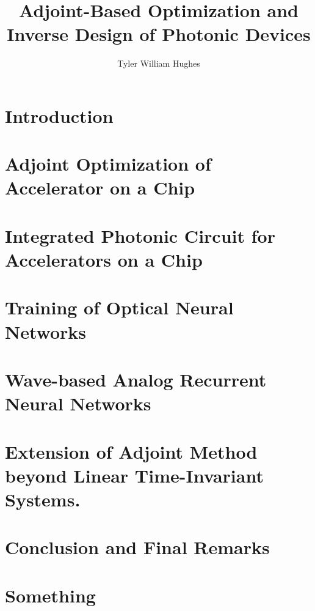 \documentclass{report}
\begin{document}
\title{Adjoint-Based Optimization and Inverse Design of Photonic Devices}
\author{Tyler William Hughes}
 
\beforepreface
{}


\afterpreface


\chapter{Introduction}


\chapter{Adjoint Optimization of Accelerator on a Chip}


\chapter{Integrated Photonic Circuit for Accelerators on a Chip}


\chapter{Training of Optical Neural Networks}


\chapter{Wave-based Analog Recurrent Neural Networks}


\chapter{Extension of Adjoint Method beyond Linear Time-Invariant Systems.}


\chapter{Conclusion and Final Remarks}



\appendix
\chapter{Something}





\end{document}
